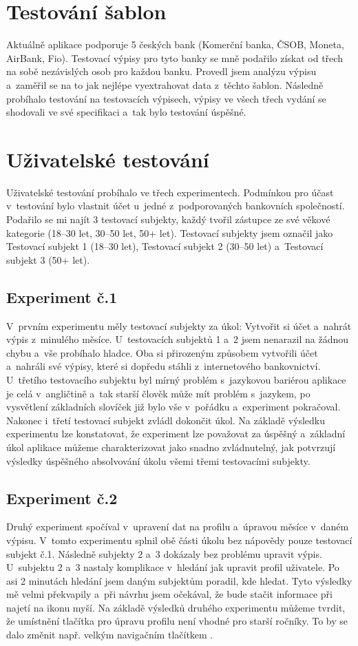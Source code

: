 \section{Testování šablon}
Aktuálně aplikace podporuje 5 českých bank (Komerční banka, ČSOB, Moneta, AirBank, Fio). Testovací výpisy pro tyto banky se mně podařilo získat od třech na sobě nezávislých osob pro každou banku. Provedl jsem analýzu výpisu a~zaměřil se na to jak nejlépe vyextrahovat data z~těchto šablon. Následně probíhalo testování na testovacích výpisech, výpisy ve všech třech vydání se shodovali ve své specifikaci a~tak bylo testování úspěšné.
\section{Uživatelské testování}
Uživatelské testování probíhalo ve třech experimentech. Podmínkou pro účast v~testování bylo vlastnit účet u~jedné z~podporovaných bankovních společností. Podařilo se mi najít 3 testovací subjekty, každý tvořil zástupce ze své věkové kategorie (18--30 let, 30--50 let, 50+ let). Testovací subjekty jsem označil jako Testovací subjekt 1 (18--30 let), Testovací subjekt 2 (30--50 let) a~Testovací subjekt 3 (50+ let).
\subsection{Experiment č.1}
V~prvním experimentu měly testovací subjekty za úkol: Vytvořit si účet a~nahrát výpis z~minulého měsíce. U~testovacích subjektů 1 a~2 jsem nenarazil na žádnou chybu a~vše probíhalo hladce. Oba si přirozeným způsobem vytvořili účet a~nahráli své výpisy, které si dopředu stáhli z~internetového bankovnictví. U~třetího testovacího subjektu byl mírný problém s~jazykovou bariérou aplikace je celá v~angličtině a~tak starší člověk může mít problém s~jazykem, po vysvětlení základních slovíček již bylo vše v~pořádku a~experiment pokračoval. Nakonec i~třetí testovací subjekt zvládl dokončit úkol.
Na základě výsledku experimentu lze konstatovat, že experiment lze považovat za úspěšný a~základní úkol aplikace můžeme charakterizovat jako snadno zvládnutelný, jak potvrzují výsledky úspěšného absolvování úkolu všemi třemi testovacími subjekty.
\subsection{Experiment č.2}
Druhý experiment spočíval v~upravení dat na profilu a~úpravou měsíce v~daném výpisu. V~tomto experimentu splnil obě části úkolu bez nápovědy pouze testovací subjekt č.1. Následně subjekty 2 a~3 dokázaly bez problému upravit výpis. U~subjektu 2 a~3 nastaly komplikace v~hledání jak upravit profil uživatele. Po asi 2 minutách hledání jsem daným subjektům poradil, kde hledat. Tyto výsledky mě velmi překvapily a~při návrhu jsem očekával, že bude stačit informace  při najetí na ikonu myší. 
Na základě výsledků druhého experimentu můžeme tvrdit, že umístnění tlačítka pro úpravu profilu není vhodné pro starší ročníky. To by se dalo změnit např. velkým navigačním tlačítkem . 
